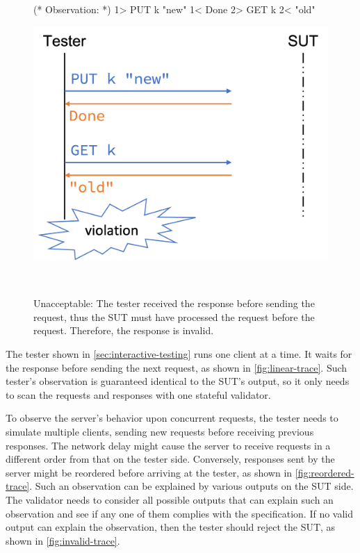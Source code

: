 \begin{figure}
  \centering
  \begin{minipage}[c]{.3\textwidth}
\begin{coq}
  (* Observation: *)
  1> PUT k "new"
  1< Done
  2> GET k
  2< "old"
\end{coq}
  \end{minipage}\begin{minipage}[c]{.4\textwidth}
  \includegraphics[width=\linewidth]{figures/invalid-trace}
  \end{minipage}\begin{minipage}[c]{.3\textwidth}\
  \end{minipage}
  \caption[Invalid trace that violates the specification.]{Unacceptable: The
    tester received the \ilc{Done} response before sending the 
    request, thus the SUT must have processed the \ilc{PUT} request before the
    \ilc{GET} request.  Therefore, the \ilc{"old"} response is invalid.}
  \label{fig:invalid-trace}
\end{figure}
The tester shown in \autoref{sec:interactive-testing} runs one client at a time.
It waits for the response before sending the next request, as shown in
\autoref{fig:linear-trace}.  Such tester's observation is guaranteed identical
to the SUT's output, so it only needs to scan the requests and responses with
one stateful validator.

To observe the server's behavior upon concurrent requests, the tester needs to
simulate multiple clients, sending new requests before receiving previous
responses.  The network delay might cause the server to receive requests in a
different order from that on the tester side.  Conversely, responses sent by the
server might be reordered before arriving at the tester, as shown in
\autoref{fig:reordered-trace}.  Such an observation can be explained by various
outputs on the SUT side.  The validator needs to consider all possible outputs
that can explain such an observation and see if any one of them complies with
the specification.  If no valid output can explain the observation, then the
tester should reject the SUT, as shown in \autoref{fig:invalid-trace}.

